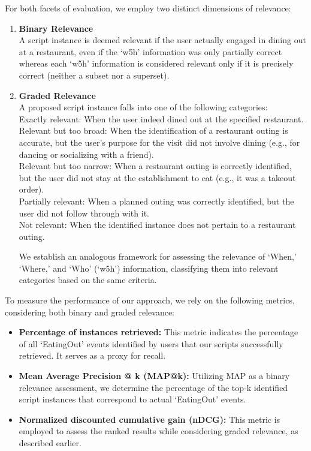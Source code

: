 \documentclass[11pt]{article}
\begin{document}
For both facets of evaluation, we employ two distinct dimensions of relevance:
\begin{enumerate}[noitemsep]
    \item \textbf{Binary Relevance}\\
    A script instance is deemed relevant if the user actually engaged in dining out at a restaurant, even if the `w5h' information was only partially correct whereas each `w5h' information is considered relevant only if it is precisely correct (neither a subset nor a superset). 
\item \textbf{Graded Relevance}\\
A proposed script instance falls into one of the following categories:\\
Exactly relevant: When the user indeed dined out at the specified restaurant.\\
Relevant but too broad: When the identification of a restaurant outing is accurate, but the user's purpose for the visit did not involve dining (e.g., for dancing or socializing with a friend).\\
Relevant but too narrow: When a restaurant outing is correctly identified, but the user did not stay at the establishment to eat (e.g., it was a takeout order).\\
Partially relevant: When a planned outing was correctly identified, but the user did not follow through with it.\\
Not relevant: When the identified instance does not pertain to a restaurant outing.

We establish an analogous framework for assessing the relevance of `When,' `Where,' and `Who' (`w5h') information, classifying them into relevant categories based on the same criteria.    
\end{enumerate}

To measure the performance of our approach, we rely on the following metrics, considering both binary and graded relevance:
\begin{itemize}[noitemsep]
    \item \textbf{Percentage of instances retrieved:} This metric indicates the percentage of all `EatingOut' events identified by users that our scripts successfully retrieved. It serves as a proxy for recall.
    \item \textbf{Mean Average Precision @ k (MAP@k):} Utilizing MAP as a binary relevance assessment, we determine the percentage of the top-k identified script instances that correspond to actual `EatingOut' events. 
    \item \textbf{Normalized discounted cumulative gain (nDCG):} This metric is employed to assess the ranked results while considering graded relevance, as described earlier. 
\end{itemize}
\end{document}
